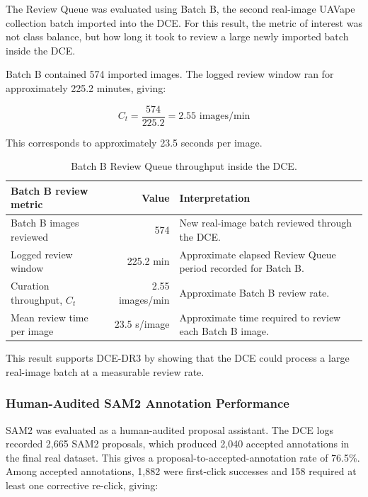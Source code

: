 The Review Queue was evaluated using Batch B, the second real-image UAVape collection batch imported into the DCE. For this result, the metric of interest was not class balance, but how long it took to review a large newly imported batch inside the DCE.

Batch B contained 574 imported images. The logged review window ran for approximately 225.2 minutes, giving:

\begin{equation}
C_t = \frac{574}{225.2} = 2.55 \text{ images/min}
\end{equation}

This corresponds to approximately 23.5 seconds per image.

\begin{table}[H]
\centering
\small
\renewcommand{\arraystretch}{1.2}
\begin{tabularx}{\textwidth}{p{} r X}
\toprule
\textbf{Batch B review metric} & \textbf{Value} & \textbf{Interpretation} \\
\midrule
Batch B images reviewed & 574 & New real-image batch reviewed through the DCE. \\
Logged review window & 225.2 min & Approximate elapsed Review Queue period recorded for Batch B. \\
Curation throughput, $C_t$ & 2.55 images/min & Approximate Batch B review rate. \\
Mean review time per image & 23.5 s/image & Approximate time required to review each Batch B image. \\
\bottomrule
\end{tabularx}
\caption{Batch B Review Queue throughput inside the DCE.}
\label{tab:dce_results_curation}
\end{table}

This result supports DCE-DR3 by showing that the DCE could process a large real-image batch at a measurable review rate.

\subsubsection{Human-Audited SAM2 Annotation Performance}

SAM2 was evaluated as a human-audited proposal assistant. The DCE logs recorded 2,665 SAM2 proposals, which produced 2,040 accepted annotations in the final real dataset. This gives a proposal-to-accepted-annotation rate of 76.5\%. Among accepted annotations, 1,882 were first-click successes and 158 required at least one corrective re-click, giving:

